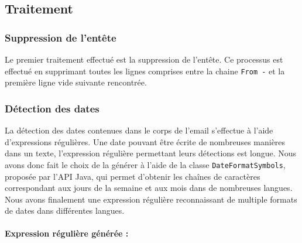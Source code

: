 \documentclass[a4paper,french,10pt]{article}
\begin{document}
\subsection{Traitement}

\subsubsection{Suppression de l'entête}
Le premier traitement effectué est la suppression de l'entête. Ce processus est effectué en supprimant toutes les lignes comprises entre la chaine \og \texttt{From -} \fg{} et la première ligne vide suivante rencontrée.

\subsubsection{Détection des dates}
La détection des dates contenues dans le corps de l'email s'effectue à l'aide d'expressions régulières. Une date pouvant être écrite de nombreuses manières dans un texte, l'expression régulière permettant leurs détections est longue. Nous avons donc fait le choix de la générer à l'aide de la classe \texttt{DateFormatSymbols}, proposée par l'API Java, qui permet d'obtenir les chaînes de caractères correspondant aux jours de la semaine et aux mois dans de nombreuses langues. Nous avons finalement une expression régulière reconnaissant de multiple formats de dates dans différentes langues.

\paragraph*{Expression régulière générée :}
\end{document}
